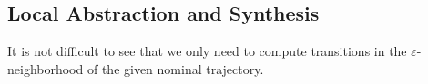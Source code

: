 \subsection{Local Abstraction and Synthesis}

\begin{comment}
We introduce some notation.
Given a state $\widetilde x=(x,k)$ of a control system $\widetilde \Sigma$, and given the parameter $\varepsilon\in \mathbb{R}_{>0}^{|X|}$, we use the notation $\ball_\varepsilon(\widetilde x)$ to denote the ball centered around $x$ and having radius $\varepsilon$ in the state variables and having radius zero for the time variable $s$.
Formally, \[\ball_\varepsilon(\widetilde{x})\coloneqq \set{(x',k')
	\in \sem{\widetilde{X}} \mid  d_X(x'[X],x[X])\leq \varepsilon \land (x'[\set{s}]\equiv x[\set{s}])}.\] 
\end{comment}

It is not difficult to see that we only need to compute transitions in the $\varepsilon$-neighborhood of the given nominal trajectory.

